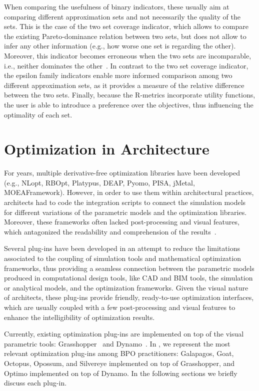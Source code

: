 	When comparing the usefulness of binary indicators, these usually aim at comparing different approximation sets and not necessarily the quality of the sets. This is the case of the two set coverage indicator, which allows to compare the existing Pareto-dominance relation between two sets, but does not allow to infer any other information (e.g., how worse one set is regarding the other). Moreover, this indicator becomes erroneous when the two sets are incomparable, i.e., neither dominates the other~\cite{Zitzler2003Metrics}. In contrast to the two set coverage indicator, the epsilon family indicators enable more informed comparison among two different approximation sets, as it provides a measure of the relative difference between the two sets. Finally, because the R-metrics incorporate utility functions, the user is able to introduce a preference over the objectives, thus influencing the optimality of each set. 

	
	
	
\section{Optimization in Architecture}	
	\label{sec:plugins}
	
	For years, multiple derivative-free optimization libraries have been developed (e.g., NLopt, RBOpt, Platypus, DEAP, Pyomo, PISA, jMetal, MOEAFramework). However, in order to use them within architectural practices, architects had to code the integration scripts to connect the simulation models for different variations of the parametric models and the optimization libraries\cite{Attia2013}. Moreover, these frameworks often lacked post-processing and visual features, which antagonized the readability and comprehension of the results~\cite{Attia2013,Nguyen2014}.
	
	Several plug-ins have been developed in an attempt to reduce the limitations associated to the coupling of simulation tools and mathematical optimization frameworks, thus providing a seamless connection between the parametric models produced in computational design tools, like \ac{CAD} and \ac{BIM} tools, the simulation or analytical models, and the optimization frameworks. Given the visual nature of architects, these plug-ins provide friendly, ready-to-use optimization interfaces, which are usually coupled with a few post-processing and visual features to enhance the intelligibility of optimization results. 
	
	Currently, existing optimization plug-ins are implemented on top of the visual parametric tools: Grasshopper~\cite{GRASSHOPPER} and Dynamo~\cite{DYNAMOBIM}. In , we represent the most relevant optimization plug-ins among \ac{BPO} practitioners: Galapagos, Goat, Octopus, Opossum, and Silvereye implemented on top of Grasshopper, and Optimo implemented on top of Dynamo. In the following sections we briefly discuss each plug-in.
	
